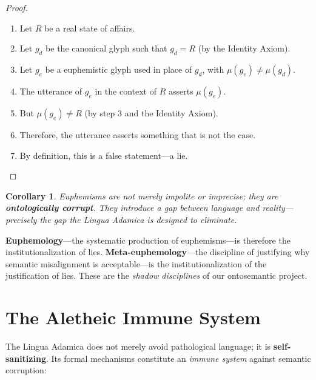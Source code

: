 \documentclass[12pt, letterpaper]{book}
\def\equiv{=}%
\def\mathfrak#1{#1}%
\newtheorem{corollary}[theorem]{Corollary}
\begin{document}
\begin{proof}
\begin{enumerate}
    \item Let $R$ be a real state of affairs.
    \item Let $\mathfrak{g}_d$ be the canonical glyph such that $\mathfrak{g}_d \equiv R$ (by the Identity Axiom).
    \item Let $\mathfrak{g}_e$ be a euphemistic glyph used in place of $\mathfrak{g}_d$, with $\mu(\mathfrak{g}_e) \neq \mu(\mathfrak{g}_d)$.
    \item The utterance of $\mathfrak{g}_e$ in the context of $R$ asserts $\mu(\mathfrak{g}_e)$.
    \item But $\mu(\mathfrak{g}_e) \not\equiv R$ (by step 3 and the Identity Axiom).
    \item Therefore, the utterance asserts something that is not the case.
    \item By definition, this is a false statement---a lie. \qedhere
\end{enumerate}
\end{proof}

\begin{corollary}
Euphemisms are not merely impolite or imprecise; they are \textbf{ontologically corrupt}. They introduce a gap between language and reality---precisely the gap the Lingua Adamica is designed to eliminate.
\end{corollary}

\textbf{Euphemology}---the systematic production of euphemisms---is therefore the institutionalization of lies. \textbf{Meta-euphemology}---the discipline of justifying why semantic misalignment is acceptable---is the institutionalization of the justification of lies. These are the \textit{shadow disciplines} of our ontosemantic project.

\section{The Aletheic Immune System}

The Lingua Adamica does not merely avoid pathological language; it is \textbf{self-sanitizing}. Its formal mechanisms constitute an \textit{immune system} against semantic corruption:
\end{document}
